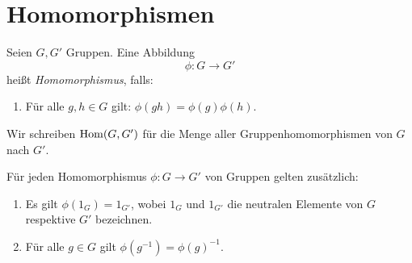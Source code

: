 \documentclass{book}
\begin{document}
\section{Homomorphismen}%
\label{sec:homomorphismen}

\begin{defi}
    \label{defi:ghom}
    Seien $G,G'$ Gruppen. Eine Abbildung  
    \[
        \phi: G \to G'
    \]
    heißt {\em Homomorphismus}, falls:
    \begin{enumerate}[leftmargin=1.2cm, label=(H\arabic*), series=hom]
        \item\label{it:H1} Für alle $g,h \in G$ gilt: $\phi(gh) = \phi(g)\phi(h)$.
    \end{enumerate}
    Wir schreiben $\operatorname{Hom}(G,G')$ für die Menge aller Gruppenhomomorphismen von
    $G$ nach $G'$. 
\end{defi}

\begin{prob}
    \label{prob:hom}
    Für jeden Homomorphismus $\phi: G \to G'$ von Gruppen gelten zusätzlich:
    \begin{enumerate}[leftmargin=1.2cm,label=(H\arabic*), resume=hom]
        \item\label{it:H2} Es gilt $\phi(1_G) = 1_{G'}$, wobei $1_G$ und $1_{G'}$ die
            neutralen Elemente von $G$ respektive $G'$ bezeichnen.
        \item\label{it:H3} Für alle $g \in G$ gilt $\phi(g^{-1})= \phi(g)^{-1}$. 
    \end{enumerate}
\end{prob}
\end{document}
